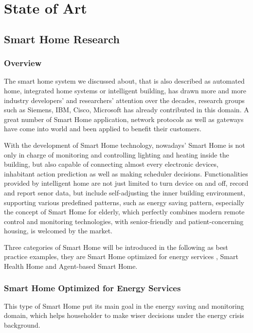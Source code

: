 \chapter{State of Art}
\section{Smart Home Research}
\subsection{Overview}
The smart home system we discussed about, that is also described as automated home, integrated home systems or intelligent building\cite{smart_home_concept}, has drawn more and more industry developers' and researchers' attention over the decades, research groups such as Siemens, IBM, Cisco, Microsoft\cite{smart_home_research} has already contributed in this domain. A great number of Smart Home application, network protocols as well as gateways\cite{smart_home_for_gateway} have come into world and been applied to benefit their customers.

With the development of Smart Home technology, nowadays' Smart Home is not only in charge of monitoring and controlling lighting and heating inside the building, but also capable of connecting almost every electronic devices, inhabitant action prediction as well as making scheduler decisions. Functionalities provided by intelligent home are not just limited to turn device on and off, record and report senor data, but include self-adjusting the inner building environment, supporting various predefined patterns, such as energy saving pattern, especially the concept of Smart Home for elderly\cite{smart_home_for_old}, which perfectly combines modern remote control and monitoring technologies, with senior-friendly and patient-concerning housing, is welcomed by the market. 

Three categories of Smart Home will be introduced in the following as best practice examples, they are Smart Home optimized for energy services , Smart Health Home and Agent-based Smart Home.
 
\subsection{Smart Home Optimized for Energy Services}
This type of Smart Home put its main goal in the energy saving and monitoring domain, which helps householder to make wiser decisions under the energy crisis background. 


